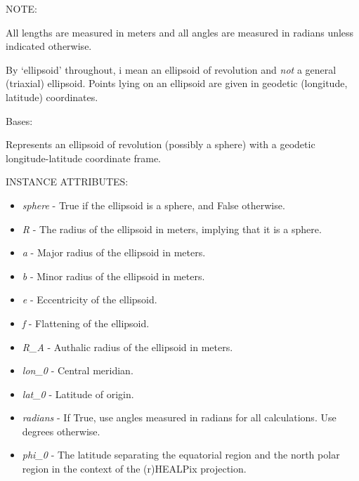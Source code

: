 \documentclass[a4paper,12ptopenany,oneside]{sphinxmanual}
\begin{document}
NOTE:

All lengths are measured in meters and all angles are measured in radians 
unless indicated otherwise.

By `ellipsoid' throughout, i mean an ellipsoid of revolution and \emph{not} a general (triaxial) ellipsoid.
Points lying on an ellipsoid are given in geodetic (longitude, latitude) coordinates.

\begin{fulllineitems}
\label{ellipsoids:ellipsoids.Ellipsoid}
Bases: 

Represents an ellipsoid of revolution (possibly a sphere) with a 
geodetic longitude-latitude coordinate frame.

INSTANCE ATTRIBUTES:
\begin{itemize}
\item {} 
\emph{sphere} - True if the ellipsoid is a sphere, and False otherwise.

\item {} 
\emph{R} - The radius of the ellipsoid in meters, implying that it is a 
sphere.

\item {} 
\emph{a} - Major radius of the ellipsoid in meters.

\item {} 
\emph{b} - Minor radius of the ellipsoid in meters.

\item {} 
\emph{e} - Eccentricity of the ellipsoid.

\item {} 
\emph{f} - Flattening of the ellipsoid.

\item {} 
\emph{R\_A} - Authalic radius of the ellipsoid in meters.

\item {} 
\emph{lon\_0} - Central meridian.

\item {} 
\emph{lat\_0} - Latitude of origin.

\item {} 
\emph{radians} - If True, use angles measured in radians for all calculations.
Use degrees otherwise.

\item {} 
\emph{phi\_0} - The latitude separating the equatorial region and 
the north polar region in the context of the (r)HEALPix projection.


\end{itemize}
\end{fulllineitems}
\end{document}
